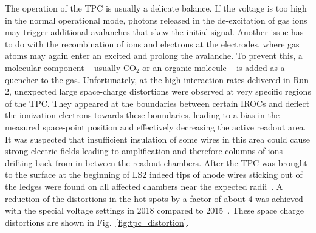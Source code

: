 The operation of the TPC is usually a delicate balance. If the voltage is too high in the normal operational mode, photons released in the de-excitation of gas ions may trigger additional avalanches that skew the initial signal. Another issue has to do with the recombination of ions and electrons at the electrodes, where gas atoms may again enter an excited and prolong the avalanche. To prevent this, a molecular component – usually CO$_2$ or an organic molecule – is added as a quencher to the gas. Unfortunately, at the high interaction rates delivered in Run 2, unexpected large space-charge distortions were observed at very specific regions of the TPC. They appeared at the boundaries between certain IROCs and deflect the ionization electrons towards these boundaries, leading to a bias in the measured space-point position and effectively decreasing the active readout area. It was suspected that insufficient insulation of some wires in this area could cause strong electric fields leading to amplification and therefore columns of ions drifting back from in between the readout chambers. After the TPC was brought to the surface at the beginning of LS2 indeed tips of anode wires sticking out of the ledges were found on all affected chambers near the expected radii~\cite{Schmidt2020}. A reduction of the distortions in the hot spots by a factor of about 4 was achieved with the special voltage settings in 2018 compared to 2015~. These space charge distortions are shown in Fig.~\ref{fig:tpc_distortion}.

